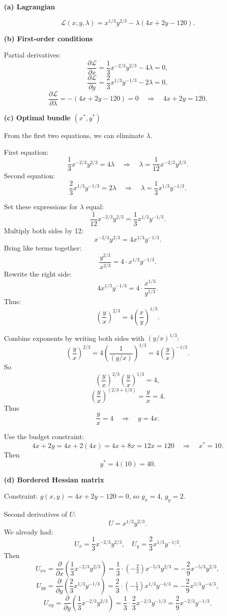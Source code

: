 \documentclass[12pt]{article}
\begin{document}
\textbf{(a) Lagrangian}

\[
\mathcal{L}(x,y,\lambda) = x^{1/3}y^{2/3} - \lambda(4x + 2y - 120).
\]

\textbf{(b) First-order conditions}

Partial derivatives:
\[
\frac{\partial \mathcal{L}}{\partial x}
= \frac{1}{3}x^{-2/3} y^{2/3} - 4\lambda = 0,
\]
\[
\frac{\partial \mathcal{L}}{\partial y}
= \frac{2}{3}x^{1/3} y^{-1/3} - 2\lambda = 0,
\]
\[
\frac{\partial \mathcal{L}}{\partial \lambda}
= -(4x + 2y - 120) = 0 \quad \Rightarrow\quad 4x + 2y = 120.
\]

\textbf{(c) Optimal bundle \((x^\ast,y^\ast)\)}

From the first two equations, we can eliminate \(\lambda\).

First equation:
\[
\frac{1}{3}x^{-2/3} y^{2/3} = 4\lambda \quad \Rightarrow \quad \lambda = \frac{1}{12}x^{-2/3}y^{2/3}.
\]
Second equation:
\[
\frac{2}{3}x^{1/3} y^{-1/3} = 2\lambda \quad \Rightarrow \quad \lambda = \frac{1}{3}x^{1/3}y^{-1/3}.
\]

Set these expressions for \(\lambda\) equal:
\[
\frac{1}{12}x^{-2/3}y^{2/3} = \frac{1}{3}x^{1/3}y^{-1/3}.
\]
Multiply both sides by 12:
\[
x^{-2/3}y^{2/3} = 4 x^{1/3}y^{-1/3}.
\]
Bring like terms together:
\[
\frac{y^{2/3}}{x^{2/3}} = 4 \cdot x^{1/3}y^{-1/3}.
\]
Rewrite the right side:
\[
4 x^{1/3}y^{-1/3} = 4 \cdot \frac{x^{1/3}}{y^{1/3}}.
\]
Thus:
\[
\left(\frac{y}{x}\right)^{2/3} = 4 \left(\frac{x}{y}\right)^{1/3}.
\]

Combine exponents by writing both sides with \((y/x)^{1/3}\):
\[
\left(\frac{y}{x}\right)^{2/3} = 4 \left(\frac{1}{(y/x)}\right)^{1/3}
= 4 \left(\frac{y}{x}\right)^{-1/3}.
\]
So
\[
\left(\frac{y}{x}\right)^{2/3} \left(\frac{y}{x}\right)^{1/3}
= 4,
\]
\[
\left(\frac{y}{x}\right)^{(2/3+1/3)} = \frac{y}{x} = 4.
\]
Thus
\[
\frac{y}{x} = 4 \quad \Rightarrow \quad y=4x.
\]

Use the budget constraint:
\[
4x + 2y = 4x + 2(4x) = 4x + 8x = 12x = 120 \quad \Rightarrow \quad x^\ast = 10.
\]
Then
\[
y^\ast = 4(10) = 40.
\]

\textbf{(d) Bordered Hessian matrix}

Constraint: \(g(x,y) = 4x + 2y - 120 = 0\), so \(g_x=4\), \(g_y=2\).

Second derivatives of \(U\):
\[
U = x^{1/3}y^{2/3}.
\]
We already had:
\[
U_x = \frac{1}{3}x^{-2/3}y^{2/3}, \quad U_y = \frac{2}{3}x^{1/3}y^{-1/3}.
\]
Then
\[
U_{xx} = \frac{\partial}{\partial x}\left(\frac{1}{3}x^{-2/3}y^{2/3}\right)
= \frac{1}{3}\cdot (-\tfrac{2}{3})x^{-5/3}y^{2/3}
= -\frac{2}{9}x^{-5/3}y^{2/3},
\]
\[
U_{yy} = \frac{\partial}{\partial y}\left(\frac{2}{3}x^{1/3}y^{-1/3}\right)
= \frac{2}{3}\cdot(-\tfrac{1}{3})x^{1/3}y^{-4/3}
= -\frac{2}{9}x^{1/3}y^{-4/3},
\]
\[
U_{xy} = \frac{\partial}{\partial y}\left(\frac{1}{3}x^{-2/3}y^{2/3}\right)
= \frac{1}{3}\cdot \frac{2}{3}x^{-2/3}y^{-1/3}
= \frac{2}{9}x^{-2/3}y^{-1/3}.
\]
\end{document}
